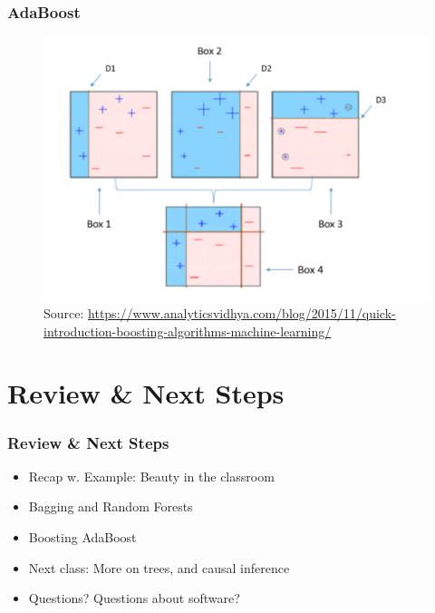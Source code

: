 \documentclass[
  shownotes,
  xcolor={svgnames},
  hyperref={colorlinks,citecolor=DarkBlue,linkcolor=DarkRed,urlcolor=DarkBlue}
  , aspectratio=169]{beamer}
\begin{document}
\begin{frame}[fragile]
\frametitle{AdaBoost}


\begin{figure}[H] \centering
            \captionsetup{justification=centering}
              \includegraphics[scale=0.5]{figures/adaboost.png}
              \\
              \tiny
              Source: \url{https://www.analyticsvidhya.com/blog/2015/11/quick-introduction-boosting-algorithms-machine-learning/}
 \end{figure}

\end{frame}
\section{Review
 \& Next Steps}
\begin{frame}
\frametitle{Review \& Next Steps}
  
\begin{itemize} 
   \item Recap w. Example: Beauty in the classroom
   \bigskip
   \item Bagging and Random Forests
   \bigskip
  \item Boosting AdaBoost
    \bigskip  
  \item  Next class:  More on trees, and causal inference


\bigskip  
\item Questions? Questions about software? 

\end{itemize}
\end{frame}
\end{document}
